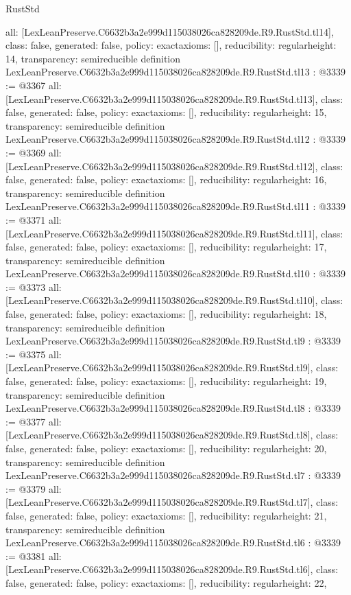 \begin{lexlean}{RustStd}
\begin{coremodule}
{  all: [LexLeanPreserve.C6632b3a2e999d115038026ca828209de.R9.RustStd.tl14],
  class: false,
  generated: false,
  policy: exact{axioms: []},
  reducibility: regular{height: 14},
  transparency: semireducible
}
definition LexLeanPreserve.C6632b3a2e999d115038026ca828209de.R9.RustStd.tl13 : @3339 := @3367 {
  all: [LexLeanPreserve.C6632b3a2e999d115038026ca828209de.R9.RustStd.tl13],
  class: false,
  generated: false,
  policy: exact{axioms: []},
  reducibility: regular{height: 15},
  transparency: semireducible
}
definition LexLeanPreserve.C6632b3a2e999d115038026ca828209de.R9.RustStd.tl12 : @3339 := @3369 {
  all: [LexLeanPreserve.C6632b3a2e999d115038026ca828209de.R9.RustStd.tl12],
  class: false,
  generated: false,
  policy: exact{axioms: []},
  reducibility: regular{height: 16},
  transparency: semireducible
}
definition LexLeanPreserve.C6632b3a2e999d115038026ca828209de.R9.RustStd.tl11 : @3339 := @3371 {
  all: [LexLeanPreserve.C6632b3a2e999d115038026ca828209de.R9.RustStd.tl11],
  class: false,
  generated: false,
  policy: exact{axioms: []},
  reducibility: regular{height: 17},
  transparency: semireducible
}
definition LexLeanPreserve.C6632b3a2e999d115038026ca828209de.R9.RustStd.tl10 : @3339 := @3373 {
  all: [LexLeanPreserve.C6632b3a2e999d115038026ca828209de.R9.RustStd.tl10],
  class: false,
  generated: false,
  policy: exact{axioms: []},
  reducibility: regular{height: 18},
  transparency: semireducible
}
definition LexLeanPreserve.C6632b3a2e999d115038026ca828209de.R9.RustStd.tl9 : @3339 := @3375 {
  all: [LexLeanPreserve.C6632b3a2e999d115038026ca828209de.R9.RustStd.tl9],
  class: false,
  generated: false,
  policy: exact{axioms: []},
  reducibility: regular{height: 19},
  transparency: semireducible
}
definition LexLeanPreserve.C6632b3a2e999d115038026ca828209de.R9.RustStd.tl8 : @3339 := @3377 {
  all: [LexLeanPreserve.C6632b3a2e999d115038026ca828209de.R9.RustStd.tl8],
  class: false,
  generated: false,
  policy: exact{axioms: []},
  reducibility: regular{height: 20},
  transparency: semireducible
}
definition LexLeanPreserve.C6632b3a2e999d115038026ca828209de.R9.RustStd.tl7 : @3339 := @3379 {
  all: [LexLeanPreserve.C6632b3a2e999d115038026ca828209de.R9.RustStd.tl7],
  class: false,
  generated: false,
  policy: exact{axioms: []},
  reducibility: regular{height: 21},
  transparency: semireducible
}
definition LexLeanPreserve.C6632b3a2e999d115038026ca828209de.R9.RustStd.tl6 : @3339 := @3381 {
  all: [LexLeanPreserve.C6632b3a2e999d115038026ca828209de.R9.RustStd.tl6],
  class: false,
  generated: false,
  policy: exact{axioms: []},
  reducibility: regular{height: 22},
}
\end{coremodule}
\end{lexlean}

